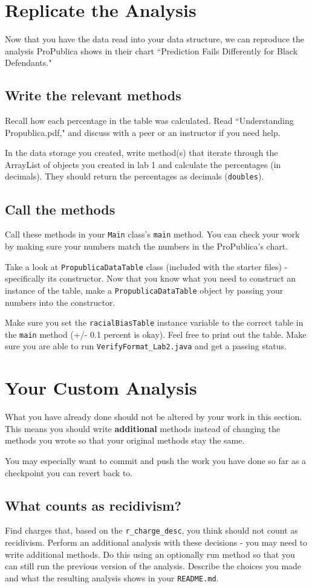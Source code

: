 \documentclass[12pt]{article}
\begin{document}
\section{Replicate the Analysis}
Now that you have the data read into your data structure, we can reproduce the analysis ProPublica shows in their chart ``Prediction Fails Differently for Black Defendants."

\subsection{Write the relevant methods}
Recall how each percentage in the table was calculated. Read ``Understanding Propublica.pdf," and discuss with a peer or an instructor if you need help.

In the data storage you created, write method(s) that iterate through the ArrayList of objects you created in lab 1 and calculate the percentages (in decimals). They should return the percentages as decimals (\texttt{doubles}).

\subsection{Call the methods}
Call these methods in your \texttt{Main} class's \texttt{main} method. You can check your work by making sure your numbers match the numbers in the ProPublica's chart.

Take a look at \texttt{PropublicaDataTable} class (included with the starter files) - specifically its constructor. Now that you know what you need to construct an instance of the table, make a \texttt{PropublicaDataTable} object by passing your numbers into the constructor.

Make sure you set the \texttt{racialBiasTable} instance variable to the correct table in the \texttt{main} method (+/- 0.1 percent is okay). Feel free to print out the table. Make sure you are able to run \texttt{VerifyFormat\_Lab2.java} and get a passing status.

\section{Your Custom Analysis}
What you have already done should not be altered by your work in this section. This means you should write \textbf{additional} methods instead of changing the methods you wrote so that your original methods stay the same.

You may especially want to commit and push the work you have done so far as a checkpoint you can revert back to.

\subsection{What counts as recidivism?}
Find charges that, based on the \texttt{r\_charge\_desc}, you think should not count as recidivism.  Perform an additional analysis with these decisions - you may need to write additional methods.  Do this using an optionally run method so that you can still run the previous version of the analysis.  Describe the choices you made and what the resulting analysis shows in your \texttt{README.md}.
\end{document}
